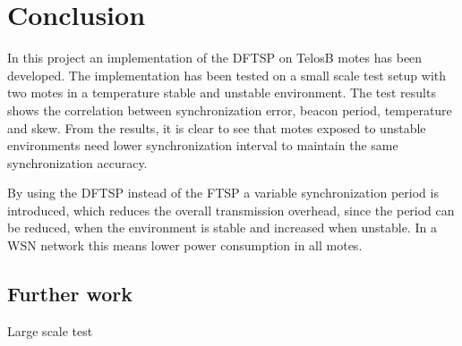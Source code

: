 \documentclass[Main]{subfiles}
\begin{document}
\section{Conclusion} %
\label{sec:conclusion}
	In this project an implementation of the DFTSP on TelosB motes has been developed. 
	The implementation has been tested on a small scale test setup with two motes in a temperature stable and unstable environment. 
	The test results shows the correlation between synchronization error, beacon period, temperature and skew.
	From the results, it is clear to see that motes exposed to unstable environments need lower synchronization interval to maintain the same synchronization accuracy.

	By using the DFTSP instead of the FTSP a variable synchronization period is introduced, which reduces the overall transmission overhead, since the period can be reduced, when the environment is stable and increased when unstable.
	In a WSN network this means lower power consumption in all motes.

	\subsection{Further work} %
	\label{sub:further_work}
		Large scale test



\end{document}
